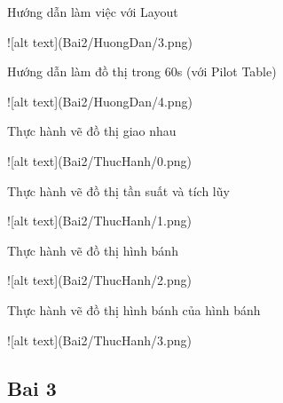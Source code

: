 \documentclass{article}
\begin{document}
\caption{Hướng dẫn làm việc với Layout}
![alt text](Bai2/HuongDan/3.png)

\caption{Hướng dẫn làm đồ thị trong 60s (với Pilot Table)}
![alt text](Bai2/HuongDan/4.png)


\caption{Thực hành vẽ đồ thị giao nhau}
![alt text](Bai2/ThucHanh/0.png)
\caption{Thực hành vẽ đồ thị tần suất và tích lũy}
![alt text](Bai2/ThucHanh/1.png)
\caption{Thực hành vẽ đồ thị hình bánh}
![alt text](Bai2/ThucHanh/2.png)
\caption{Thực hành vẽ đồ thị hình bánh của hình bánh}
![alt text](Bai2/ThucHanh/3.png)
\subsection{Bai 3}

\end{document}
